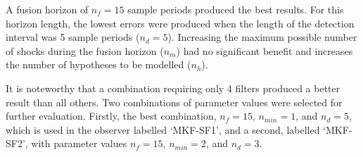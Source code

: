 



A fusion horizon of $n_f=15$ sample periods produced the best results. For this horizon length, the lowest errors were produced when the length of the detection interval was 5 sample periods ($n_d=5$). Increasing the maximum possible number of shocks during the fusion horizon ($n_m$) had no significant benefit and increases the number of hypotheses to be modelled ($n_h$).

It is noteworthy that a combination requiring only 4 filters produced a better result than all others. Two combinations of parameter values were selected for further evaluation. Firstly, the best combination, $n_f=15$, $n_{min}=1$, and $n_d=5$, which is used in the observer labelled `MKF-SF1', and a second, labelled `MKF-SF2', with parameter values $n_f=15$, $n_{min}=2$, and $n_d=3$.

